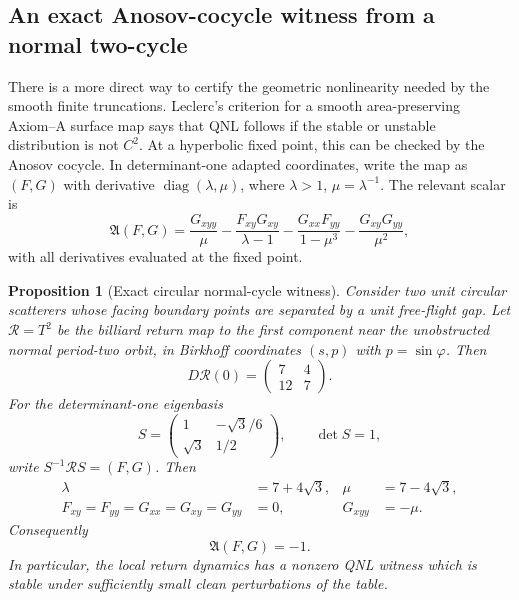 \documentclass[11pt]{article}
\newtheorem{proposition}[theorem]{Proposition}
\begin{document}
\subsection{An exact Anosov-cocycle witness from a normal two-cycle}

There is a more direct way to certify the geometric nonlinearity needed by
the smooth finite truncations.  Leclerc's criterion for a smooth
area-preserving Axiom--A surface map says that QNL follows if the stable or
unstable distribution is not $C^2$.  At a hyperbolic fixed point, this can be
checked by the Anosov cocycle.  In determinant-one adapted coordinates, write
the map as $(F,G)$ with derivative
$\operatorname{diag}(\lambda,\mu)$, where $\lambda>1$, $\mu=\lambda^{-1}$.
The relevant scalar is
\begin{equation}
\label{eq:anosov-cocycle}
 \mathfrak A(F,G)
 =\frac{G_{xyy}}{\mu}
 -\frac{F_{xy}G_{xy}}{\lambda-1}
 -\frac{G_{xx}F_{yy}}{1-\mu^3}
 -\frac{G_{xy}G_{yy}}{\mu^2},
\end{equation}
with all derivatives evaluated at the fixed point.

\begin{proposition}[Exact circular normal-cycle witness]
\label{prop:exact-circular-anosov}
Consider two unit circular scatterers whose facing boundary points are
separated by a unit free-flight gap.  Let $\mathcal R=T^2$ be the billiard
return map to the first component near the unobstructed normal period-two
orbit, in Birkhoff coordinates $(s,p)$ with $p=\sin\varphi$.  Then
\[
 D\mathcal R(0)=
 \begin{pmatrix}7&4\\12&7\end{pmatrix}.
\]
For the determinant-one eigenbasis
\[
 S=\begin{pmatrix}
       1&-\sqrt3/6\\[2pt]
       \sqrt3&1/2
    \end{pmatrix},
 \qquad \det S=1,
\]
write $S^{-1}\mathcal R S=(F,G)$.  Then
\begin{align*}
 \lambda&=7+4\sqrt3,&\mu&=7-4\sqrt3,\\
 F_{xy}=F_{yy}=G_{xx}=G_{xy}=G_{yy}&=0,
 &G_{xyy}&=-\mu.
\end{align*}
Consequently
\[
 \mathfrak A(F,G)=-1.
\]
In particular, the local return dynamics has a nonzero QNL witness which is
stable under sufficiently small clean perturbations of the table.
\end{proposition}
\end{document}
